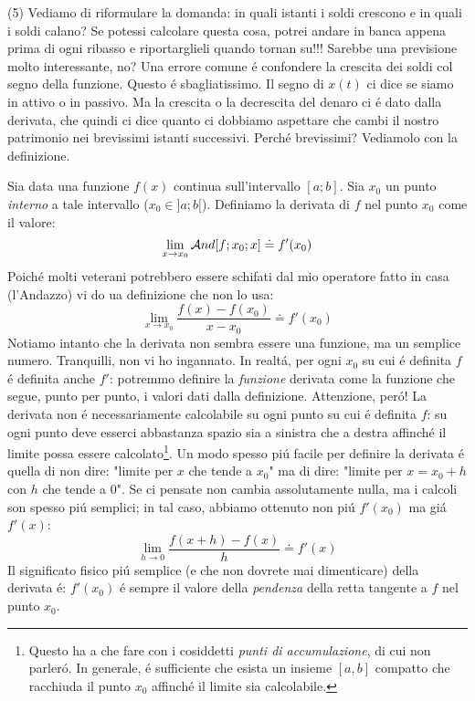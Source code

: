 (5) Vediamo di riformulare la domanda: in quali istanti i soldi crescono e in quali i soldi calano? Se potessi calcolare questa cosa, potrei andare in banca appena
  prima di ogni ribasso e riportarglieli quando tornan su!!! Sarebbe una previsione molto interessante, no? Una errore comune \'e confondere la crescita dei soldi
  col segno della funzione. Questo \'e sbagliatissimo. Il segno di $x(t)$ ci dice se siamo in attivo o in passivo. Ma la crescita o la decrescita del denaro ci \'e
  dato dalla derivata, che quindi ci dice quanto ci dobbiamo aspettare che cambi il nostro patrimonio nei brevissimi istanti successivi. Perch\'e brevissimi? Vediamolo
  con la definizione.

\begin{definizione}[Derivata]
Sia data una funzione $f(x)$ continua sull'intervallo $[a;b]$. Sia $x_0$ un punto {\em interno} a tale intervallo ($x_0 \in ]a;b[$). Definiamo la derivata di $f$ nel punto $x_0$ come il valore:
 \begin{equation}
  \lim_{x \rightarrow x_0} \mathcal{A}nd[f;x_0;x] \doteq f'(x_0)
 \end{equation}
 Poich\'e molti veterani potrebbero essere schifati dal mio operatore fatto in casa (l'Andazzo) vi do ua definizione che non lo usa:
 \begin{equation}
  \lim_{x \rightarrow x_0} \frac{f(x)-f(x_0)}{x-x_0} \doteq f'(x_0)
 \end{equation}
 Notiamo intanto che la derivata non sembra essere una funzione, ma un semplice numero. Tranquilli, non vi ho ingannato.
 In realt\'a, per ogni $x_0$ su cui \'e definita $f$ \'e definita anche $f'$: potremmo definire la {\em funzione} derivata
 come la funzione che segue, punto per punto, i valori dati dalla definizione. Attenzione, per\'o! La derivata non \'e necessariamente
 calcolabile su ogni punto su cui \'e definita $f$: su ogni punto deve esserci abbastanza spazio sia a sinistra che a destra
 affinch\'e il limite possa essere calcolato\footnote{Questo ha a che fare con i cosiddetti {\em punti di accumulazione}, di
 cui non  parler\'o. In generale, \'e sufficiente che esista un insieme $[a,b]$ compatto che racchiuda il punto $x_0$ affinch\'e
 il limite sia calcolabile.}. Un modo spesso pi\'u facile per definire la derivata \'e quella di non dire: "limite per $x$ che
 tende a $x_0$" ma di dire: "limite per $x=x_0+h$ con $h$ che tende a $0$". Se ci pensate non cambia assolutamente nulla, ma i
 calcoli son spesso pi\'u semplici; in tal caso, abbiamo ottenuto non pi\'u $f'(x_0)$ ma gi\'a $f'(x)$:
 \begin{equation}
  \lim_{h \rightarrow 0} \frac{f(x+h)-f(x)}{h} \doteq f'(x)
 \end{equation}
 Il significato fisico pi\'u semplice (e che non dovrete mai dimenticare) della derivata \'e: $f'(x_0)$ \'e sempre il valore
 della {\em pendenza } della retta tangente a $f$ nel punto $x_0$.
\end{definizione}

